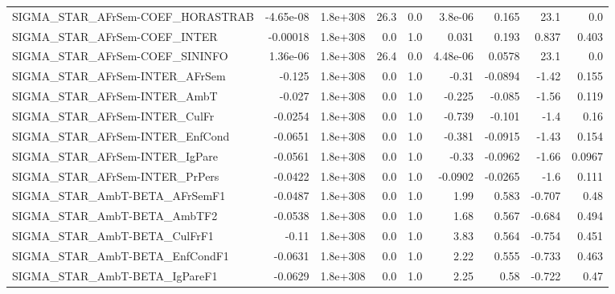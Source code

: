 \begin{tabular}{lrrrrrrrr}
SIGMA\_STAR\_AFrSem-COEF\_HORASTRAB      &   -4.65e-08 &     1.8e+308 &    26.3 &      0.0 &    3.8e-06 &       0.165 &         23.1 &           0.0 \\
SIGMA\_STAR\_AFrSem-COEF\_INTER          &    -0.00018 &     1.8e+308 &     0.0 &      1.0 &      0.031 &       0.193 &        0.837 &         0.403 \\
SIGMA\_STAR\_AFrSem-COEF\_SININFO        &    1.36e-06 &     1.8e+308 &    26.4 &      0.0 &   4.48e-06 &      0.0578 &         23.1 &           0.0 \\
SIGMA\_STAR\_AFrSem-INTER\_AFrSem        &      -0.125 &     1.8e+308 &     0.0 &      1.0 &      -0.31 &     -0.0894 &        -1.42 &         0.155 \\
SIGMA\_STAR\_AFrSem-INTER\_AmbT          &      -0.027 &     1.8e+308 &     0.0 &      1.0 &     -0.225 &      -0.085 &        -1.56 &         0.119 \\
SIGMA\_STAR\_AFrSem-INTER\_CulFr         &     -0.0254 &     1.8e+308 &     0.0 &      1.0 &     -0.739 &      -0.101 &         -1.4 &          0.16 \\
SIGMA\_STAR\_AFrSem-INTER\_EnfCond       &     -0.0651 &     1.8e+308 &     0.0 &      1.0 &     -0.381 &     -0.0915 &        -1.43 &         0.154 \\
SIGMA\_STAR\_AFrSem-INTER\_IgPare        &     -0.0561 &     1.8e+308 &     0.0 &      1.0 &      -0.33 &     -0.0962 &        -1.66 &        0.0967 \\
SIGMA\_STAR\_AFrSem-INTER\_PrPers        &     -0.0422 &     1.8e+308 &     0.0 &      1.0 &    -0.0902 &     -0.0265 &         -1.6 &         0.111 \\
SIGMA\_STAR\_AmbT-BETA\_AFrSemF1         &     -0.0487 &     1.8e+308 &     0.0 &      1.0 &       1.99 &       0.583 &       -0.707 &          0.48 \\
SIGMA\_STAR\_AmbT-BETA\_AmbTF2           &     -0.0538 &     1.8e+308 &     0.0 &      1.0 &       1.68 &       0.567 &       -0.684 &         0.494 \\
SIGMA\_STAR\_AmbT-BETA\_CulFrF1          &       -0.11 &     1.8e+308 &     0.0 &      1.0 &       3.83 &       0.564 &       -0.754 &         0.451 \\
SIGMA\_STAR\_AmbT-BETA\_EnfCondF1        &     -0.0631 &     1.8e+308 &     0.0 &      1.0 &       2.22 &       0.555 &       -0.733 &         0.463 \\
SIGMA\_STAR\_AmbT-BETA\_IgPareF1         &     -0.0629 &     1.8e+308 &     0.0 &      1.0 &       2.25 &        0.58 &       -0.722 &          0.47 \\

\end{tabular}
